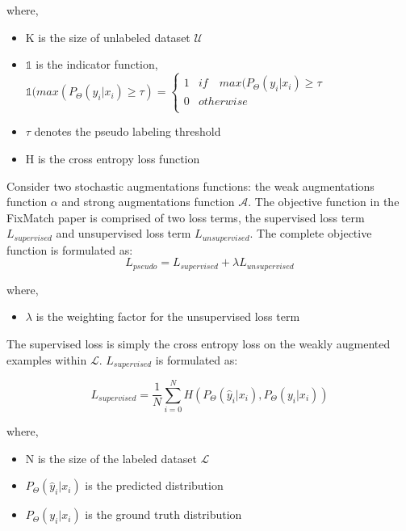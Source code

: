 where,
\begin{itemize}[label={}]
  \setlength\itemsep{0em}
  \item K is the size of unlabeled dataset $\mathcal{U}$
  \item $\mathbb{1}$ is the indicator function, $\mathbb{1}(max(P_{\Theta}(y_i | x_i) \geq \tau) = \begin{cases} 
      1 & if \quad max(P_{\Theta}(y_i | x_i) \geq \tau \\
      0 & otherwise \\
   \end{cases}$ 
   \item $\tau$ denotes the pseudo labeling threshold 
   \item H is the cross entropy loss function
\end{itemize}
Consider two stochastic augmentations functions: the weak augmentations function $\alpha$ and strong augmentations function $\mathcal{A}$. The objective function in the FixMatch paper is comprised of two loss terms, the supervised loss term $L_{supervised}$ and unsupervised loss term $L_{unsupervised}$. The complete objective function is formulated as:
\begin{equation}
    \label{equation:fixmatch_loss}
    L_{pseudo} = L_{supervised} + \lambda L_{unsupervised}
\end{equation}

where,
\begin{itemize}[label={}]
  \setlength\itemsep{0em}
  \item $\lambda$ is the weighting factor for the unsupervised loss term
\end{itemize}

The supervised loss is simply the cross entropy loss on the weakly augmented examples within $\mathcal{L}$. $L_{supervised}$ is formulated as:

\begin{equation}
    \label{equation:fixmatch_supervised_loss}
    L_{supervised} = \frac{1}{N} \sum_{i=0}^{N} H(P_{\Theta}(\hat{y}_i | x_i), P_{\Theta}(y_i | x_i))
\end{equation}

where,
\begin{itemize}[label={}]
  \setlength\itemsep{0em}
  \item N is the size of the labeled dataset $\mathcal{L}$
  \item $P_{\Theta}(\hat{y}_i | x_i)$ is the predicted distribution
  \item $P_{\Theta}(y_i | x_i)$ is the ground truth distribution
\end{itemize}

